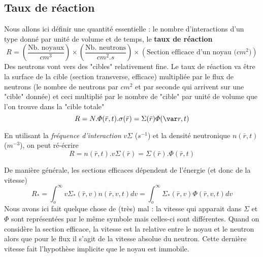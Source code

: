 \subsection{Taux de réaction}
Nous allons ici définir une quantité essentielle : le nombre d'interactions d'un type donné 
par unité de volume et de temps, le \textbf{taux de réaction}
\begin{equation}
R = \left(\dfrac{\text{Nb. noyaux}}{cm^3}\right)\times\left(\dfrac{\text{Nb. neutrons}}{cm^2.s}\right)
\times\left(\text{Section efficace d'un noyau ($cm^2$)}\right)
\end{equation}
Des neutrons vont vers des "cibles" relativement fine. Le taux de réaction va être la surface de 
la cible (section transverse, efficace) multipliée par le flux de neutrons (le nombre de neutrons 
par $cm^2$ et par seconde qui arrivent sur une "cible" donnée) et ceci multiplié par le nombre de 
"cible" par unité de volume que l'on trouve dans la "cible totale"
\begin{equation}
R = N.\varPhi(\bar r,t).\sigma(\bar r) = \Sigma(\bar r)\varPhi(\var r, t)
\end{equation}

En utilisant la \textit{fréquence d'interaction} $v\Sigma$ ($s^{-1}$) et la densité 
neutronique $n(\bar r,t)$ ($m^{-3}$), on peut ré-écrire
\begin{equation}
R = n(\bar r,t).v\Sigma(\bar r) = \Sigma(\bar r).\varPhi(\bar r,t)
\end{equation}

De manière générale, les sections efficaces dépendent de l'énergie (et donc de la vitesse)
\begin{equation}
{R_*} = \int_o^\infty     v{\Sigma _*}(\bar r,v)n(\bar r,v,t)dv = \int_o^\infty     {\Sigma _*}(\bar r,v)\varPhi (\bar r,v,t)dv
\end{equation}
Nous avons ici fait quelque chose de (très) mal : la vitesse qui apparait dans $\Sigma$ et $\varPhi$
sont représentées par le même symbole mais celles-ci sont différentes. Quand on considère la section efficace, la vitesse est la relative entre le noyau et le neutron alors que pour le flux il s'agit de la vitesse 
absolue du neutron. Cette dernière vitesse fait l'hypothèse implicite que le noyau est immobile.\\

